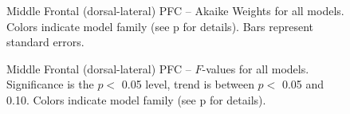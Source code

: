 \documentclass[doc,12pt]{apa}        %
\begin{document}
\begin{figure}[tp]
    \centering
    \caption{Middle Frontal (dorsal-lateral) PFC -- Akaike Weights for all models.  Colors indicate model family (see p\pageref{sub:cmb} for details). Bars represent standard errors.}
	\label{fig:dlpfc}
\end{figure}
\begin{figure}[tp]
    \centering
    \caption{Middle Frontal (dorsal-lateral) PFC -- $F$-values for all models.  Significance is the $p <$ 0.05 level, trend is between $p <$ 0.05 and 0.10.  Colors indicate model family (see p\pageref{sub:cmb} for details).}
	\label{fig:fvaldlpfc}
\end{figure}

\clearpage
\newpage

\end{document}
